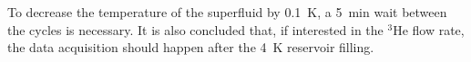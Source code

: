 To decrease the temperature of the superfluid by 0.1~K, a 5~min wait
between the cycles is necessary. It is also concluded that, if
interested in the $^3$He flow rate, the data acquisition should happen
after the 4~K reservoir filling.









  
  
  
